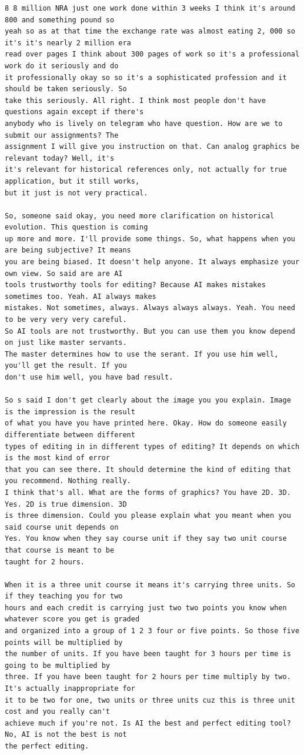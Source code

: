 {\begin{Verbatim}
8 8 million NRA just one work done within 3 weeks I think it's around 800 and something pound so
yeah so as at that time the exchange rate was almost eating 2, 000 so it's it's nearly 2 million era
read over pages I think about 300 pages of work so it's a professional work do it seriously and do
it professionally okay so so it's a sophisticated profession and it should be taken seriously. So
take this seriously. All right. I think most people don't have questions again except if there's
anybody who is lively on telegram who have question. How are we to submit our assignments? The
assignment I will give you instruction on that. Can analog graphics be relevant today? Well, it's
it's relevant for historical references only, not actually for true application, but it still works,
but it just is not very practical.

So, someone said okay, you need more clarification on historical evolution. This question is coming
up more and more. I'll provide some things. So, what happens when you are being subjective? It means
you are being biased. It doesn't help anyone. It always emphasize your own view. So said are are AI
tools trustworthy tools for editing? Because AI makes mistakes sometimes too. Yeah. AI always makes
mistakes. Not sometimes, always. Always always always. Yeah. You need to be very very very careful.
So AI tools are not trustworthy. But you can use them you know depend on just like master servants.
The master determines how to use the serant. If you use him well, you'll get the result. If you
don't use him well, you have bad result.

So s said I don't get clearly about the image you you explain. Image is the impression is the result
of what you have you have printed here. Okay. How do someone easily differentiate between different
types of editing in in different types of editing? It depends on which is the most kind of error
that you can see there. It should determine the kind of editing that you recommend. Nothing really.
I think that's all. What are the forms of graphics? You have 2D. 3D. Yes. 2D is true dimension. 3D
is three dimension. Could you please explain what you meant when you said course unit depends on
Yes. You know when they say course unit if they say two unit course that course is meant to be
taught for 2 hours.

When it is a three unit course it means it's carrying three units. So if they teaching you for two
hours and each credit is carrying just two two points you know when whatever score you get is graded
and organized into a group of 1 2 3 four or five points. So those five points will be multiplied by
the number of units. If you have been taught for 3 hours per time is going to be multiplied by
three. If you have been taught for 2 hours per time multiply by two. It's actually inappropriate for
it to be two for one, two units or three units cuz this is three unit cost and you really can't
achieve much if you're not. Is AI the best and perfect editing tool? No, AI is not the best is not
the perfect editing.


\end{Verbatim}}
